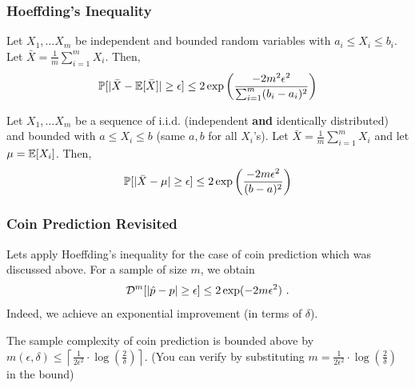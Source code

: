 \subsubsection{Hoeffding's Inequality}
\begin{theorem}
Let $X_1, \ldots X_m$ be independent and bounded random variables with $a_i \leq X_i \leq b_i$. Let $\bar{X} = \frac{1}{m} \sum_{i=1} ^m X_i$. Then,
\[
\operatorname*{\mathbb{P}} [ |\bar{X} - \mathbb{E}[\bar{X}]| \geq \epsilon ] \leq 2 \exp \left( \frac{-2m^2 \epsilon^2}{\sum _{i =1} ^m (b_i-a_i)^2} \right)
\]
\end{theorem}
\begin{corollary}
Let $X_1, \ldots X_m$ be a sequence of i.i.d. (independent \textbf{and} identically distributed) and bounded with $a \leq X_i \leq b$ (same $a, b$ for all $X_i$'s). Let $\bar{X} = \frac{1}{m} \sum_{i=1} ^m X_i$ and let $\mu = \mathbb{E}[X_i]$. Then,
\[
\operatorname*{\mathbb{P}} [|\bar{X} - \mu| \geq \epsilon] \leq 2 \exp \left( \frac{-2 m \epsilon^2}{(b-a)^2} \right)
\]
\end{corollary}

\subsubsection{Coin Prediction Revisited}
Lets apply Hoeffding's inequality for the case of coin prediction which was discussed above. For a sample of size $m$, we obtain
\[
\mathcal{D}^m [|\hat{p}-p| \ge \epsilon ]\leq  2 \exp(-2 m \epsilon ^2)~.
\]
Indeed, we achieve an exponential improvement (in terms of $\delta$).
\begin{corollary}  \label{cor:basicConcentration}
The sample complexity of coin prediction is bounded above by
$m(\epsilon,\delta) \le \left \lceil \frac{1}{2\epsilon^2} \cdot
  \log(\frac{2}{\delta}) \right \rceil$.
  (You can verify by substituting $m=\frac{1}{2\epsilon^2} \cdot
  \log(\frac{2}{\delta})$ in the bound)
\end{corollary}

